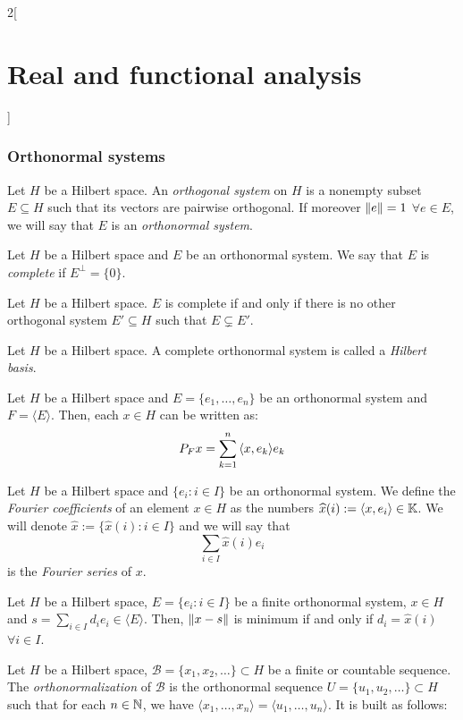 \documentclass[../../../main_math.tex]{subfiles}
\begin{document}
\begin{multicols}{2}[\section{Real and functional analysis}]
  \subsubsection{Orthonormal systems}
  \begin{definition}
    Let $H$ be a Hilbert space. An \emph{orthogonal system} on $H$ is a nonempty subset $E\subseteq H$ such that its vectors are pairwise orthogonal. If moreover $\left\|e\right\|=1 $ $\forall e\in E$, we will say that $E$ is an \emph{orthonormal system}.
  \end{definition}
  \begin{definition}
    Let $H$ be a Hilbert space and $E$ be an orthonormal system. We say that $E$ is \emph{complete} if $E^\perp =\{0\}$.
  \end{definition}
  \begin{lemma}
    Let $H$ be a Hilbert space. $E$ is complete if and only if there is no other orthogonal system $E'\subseteq H$ such that $E\subsetneq E'$.
  \end{lemma}
  \begin{definition}
    Let $H$ be a Hilbert space. A complete orthonormal system is called a \emph{Hilbert basis}.
  \end{definition}
  \begin{lemma}
    Let $H$ be a Hilbert space and $E=\{e_1,\ldots,e_n\}$ be an orthonormal system and $F=\langle E\rangle$. Then, each $x\in H$ can be written as: $$P_Fx=\sum_{k=1}^n{\left\langle x,e_k\right\rangle}e_k$$
  \end{lemma}
  \begin{definition}
    Let $H$ be a Hilbert space and $\{e_i:i\in I\}$ be an orthonormal system. We define the \emph{Fourier coefficients} of an element $x\in H$ as the numbers $\widehat{x}(i):={\left\langle x,e_i\right\rangle}\in\mathbb{K}$. We will denote $\widehat{x}:=\{\widehat{x}(i):i\in I\}$ and we will say that $$\sum_{i\in I}\widehat{x}(i)e_i$$ is the \emph{Fourier series} of $x$.
  \end{definition}
  \begin{proposition}
    Let $H$ be a Hilbert space, $E=\{e_i:i\in I\}$ be a finite orthonormal system, $x\in H$ and $s=\sum_{i\in I}d_ie_i\in\langle E\rangle$. Then, $\left\|x-s\right\|$ is minimum if and only if $d_i=\widehat{x}(i)$ $\forall i\in I$.
  \end{proposition}
  \begin{proposition}
    Let $H$ be a Hilbert space, $\mathcal{B}=\{x_1,x_2,\ldots\}\subset H$ be a finite or countable sequence. The \emph{orthonormalization} of $\mathcal{B}$ is the orthonormal sequence $U=\{u_1,u_2,\ldots\}\subset H$ such that for each $n\in \mathbb{N}$, we have $\langle x_1,\dots,x_n\rangle = \langle u_1,\dots,u_n\rangle$. It is built as follows:

\end{proposition}
\end{multicols}
\end{document}
